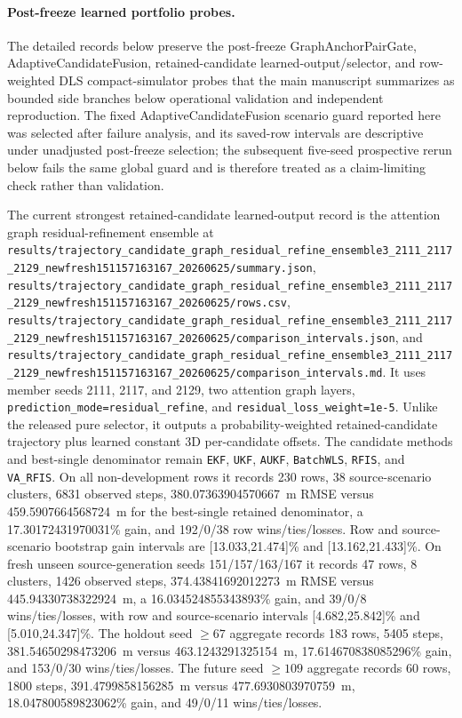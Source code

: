 \documentclass{article}
\begin{document}
\paragraph{Post-freeze learned portfolio probes.}
The detailed records below preserve the post-freeze GraphAnchorPairGate, AdaptiveCandidateFusion, retained-candidate learned-output/selector, and row-weighted DLS compact-simulator probes that the main manuscript summarizes as bounded side branches below operational validation and independent reproduction.
The fixed AdaptiveCandidateFusion scenario guard reported here was selected after failure analysis, and its saved-row intervals are descriptive under unadjusted post-freeze selection; the subsequent five-seed prospective rerun below fails the same global guard and is therefore treated as a claim-limiting check rather than validation.

The current strongest retained-candidate learned-output record is the attention graph residual-refinement ensemble at \nolinkurl{results/trajectory_candidate_graph_residual_refine_ensemble3_2111_2117_2129_newfresh151157163167_20260625/summary.json}, \nolinkurl{results/trajectory_candidate_graph_residual_refine_ensemble3_2111_2117_2129_newfresh151157163167_20260625/rows.csv}, \nolinkurl{results/trajectory_candidate_graph_residual_refine_ensemble3_2111_2117_2129_newfresh151157163167_20260625/comparison_intervals.json}, and \nolinkurl{results/trajectory_candidate_graph_residual_refine_ensemble3_2111_2117_2129_newfresh151157163167_20260625/comparison_intervals.md}. It uses member seeds 2111, 2117, and 2129, two attention graph layers, \texttt{prediction\_mode=residual\_refine}, and \texttt{residual\_loss\_weight=1e-5}. Unlike the released pure selector, it outputs a probability-weighted retained-candidate trajectory plus learned constant 3D per-candidate offsets. The candidate methods and best-single denominator remain \texttt{EKF}, \texttt{UKF}, \texttt{AUKF}, \texttt{BatchWLS}, \texttt{RFIS}, and \texttt{VA\_RFIS}. On all non-development rows it records 230 rows, 38 source-scenario clusters, 6831 observed steps, 380.07363904570667~m RMSE versus 459.5907664568724~m for the best-single retained denominator, a 17.30172431970031\% gain, and 192/0/38 row wins/ties/losses. Row and source-scenario bootstrap gain intervals are [13.033,21.474]\% and [13.162,21.433]\%. On fresh unseen source-generation seeds 151/157/163/167 it records 47 rows, 8 clusters, 1426 observed steps, 374.43841692012273~m RMSE versus 445.94330738322924~m, a 16.034524855343893\% gain, and 39/0/8 wins/ties/losses, with row and source-scenario intervals [4.682,25.842]\% and [5.010,24.347]\%. The holdout seed $\geq67$ aggregate records 183 rows, 5405 steps, 381.54650298473206~m versus 463.1243291325154~m, 17.614670838085296\% gain, and 153/0/30 wins/ties/losses. The future seed $\geq109$ aggregate records 60 rows, 1800 steps, 391.4799858156285~m versus 477.6930803970759~m, 18.047800589823062\% gain, and 49/0/11 wins/ties/losses.
\end{document}
